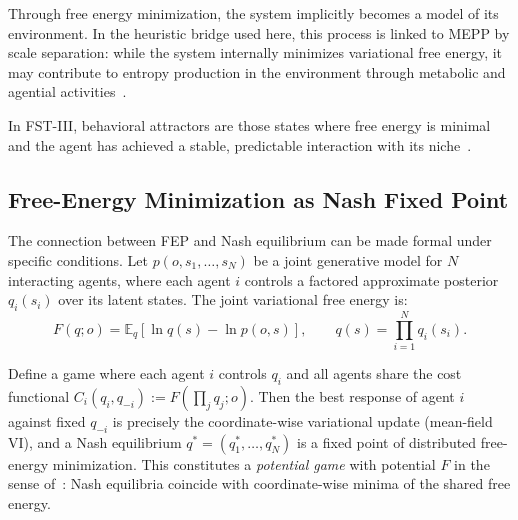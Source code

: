 \documentclass[12pt,a4paper]{article}
\theoremstyle{remark}
\begin{document}
Through free energy minimization, the system implicitly becomes a model of its environment. In the heuristic bridge used here, this process is linked to MEPP by scale separation: while the system internally minimizes variational free energy, it may contribute to entropy production in the environment through metabolic and agential activities~\citep{FristonPDF}.

In FST-III, behavioral attractors are those states where free energy is minimal and the agent has achieved a stable, predictable interaction with its niche~\citep{FristonFreeEnergy}.

\subsection{Free-Energy Minimization as Nash Fixed Point}

The connection between FEP and Nash equilibrium can be made formal under specific conditions. Let $p(o,s_1,\dots,s_N)$ be a joint generative model for $N$ interacting agents, where each agent $i$ controls a factored approximate posterior $q_i(s_i)$ over its latent states. The joint variational free energy is:
\begin{equation}
F(q; o) = \mathbb{E}_q\!\left[\ln q(s) - \ln p(o, s)\right], \qquad q(s) = \prod_{i=1}^{N} q_i(s_i).
\end{equation}

Define a game where each agent $i$ controls $q_i$ and all agents share the cost functional $C_i(q_i, q_{-i}) := F(\prod_j q_j; o)$. Then the best response of agent $i$ against fixed $q_{-i}$ is precisely the coordinate-wise variational update (mean-field VI), and a Nash equilibrium $q^* = (q_1^*, \dots, q_N^*)$ is a fixed point of distributed free-energy minimization. This constitutes a \emph{potential game} with potential $F$ in the sense of~\citet{MondererShapley1996}: Nash equilibria coincide with coordinate-wise minima of the shared free energy.
\end{document}
